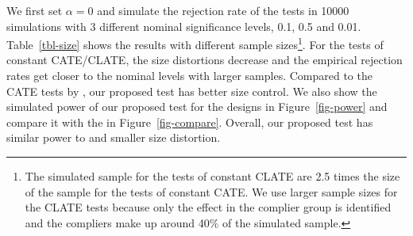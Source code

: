 \documentclass[
  12pt,
  12pt]{article}
\numberwithin{equation}{section}
\theoremstyle{definition}
\theoremstyle{plain}
\theoremstyle{plain}
\theoremstyle{remark}
\begin{document}
We first set \(\alpha = 0\) and simulate the rejection rate of the tests
in 10000 simulations with 3 different nominal significance levels, 0.1,
0.5 and 0.01. Table~\ref{tbl-size} shows the results with different
sample sizes\footnote{The simulated sample for the tests of constant
  CLATE are 2.5 times the size of the sample for the tests of constant
  CATE. We use larger sample sizes for the CLATE tests because only the
  effect in the complier group is identified and the compliers make up
  around 40\% of the simulated sample.}. For the tests of constant
CATE/CLATE, the size distortions decrease and the empirical rejection
rates get closer to the nominal levels with larger samples. Compared to
the CATE tests by \citet{crump2008nonparametric}, our proposed test has
better size control. We also show the simulated power of our proposed
test for the designs in Figure~\ref{fig-power} and compare it with the
\citet{crump2008nonparametric} in Figure~\ref{fig-compare}. Overall, our
proposed test has similar power to \citet{crump2008nonparametric} and
smaller size distortion.
\end{document}
